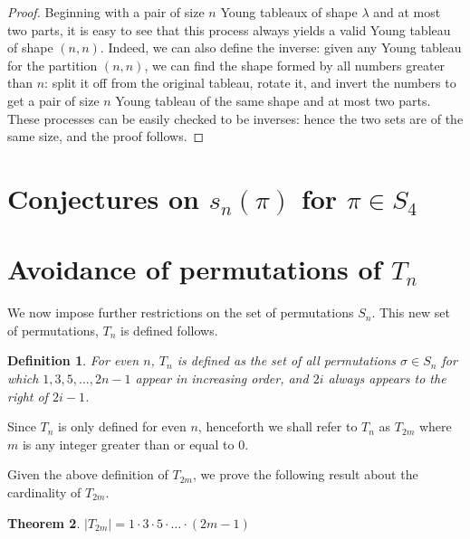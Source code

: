 \documentclass[11pt,letterpaper,twoside,english]{article}
\theoremstyle{theorem}
\newtheorem{theorem}{Theorem}
\newtheorem{definition}[theorem]{Definition}
\theoremstyle{remark}
\begin{document}
\begin{proof}
Beginning with a pair of size $n$ Young tableaux of shape $\lambda$ and at most two parts, it is easy to see that this process always yields a valid Young tableau of shape $(n, n)$. Indeed, we can also define the inverse: given any Young tableau for the partition $(n, n)$, we can find the shape formed by all numbers greater than $n$: split it off from the original tableau, rotate it, and invert the numbers to get a pair of size $n$ Young tableau of the same shape and at most two parts. These processes can be easily checked to be inverses: hence the two sets are of the same size, and the proof follows.
\end{proof}

\section{Conjectures on $s_n(\pi)$ for $\pi\in S_4$}
\label{S4}

\section{Avoidance of permutations of $T_n$}
\label{Tn}
We now impose further restrictions on the set of permutations $S_n$. This new set of permutations, $T_n$ is defined follows.

\begin{definition}
For even $n$, $T_n$ is defined as the set of all permutations $\sigma \in S_n$ for which $1,3,5,\ldots,2n-1$ appear in increasing order, and $2i$ always appears to the right of $2i-1$.
\end{definition}

Since $T_n$ is only defined for even $n$, henceforth we shall refer to $T_n$ as $T_{2m}$ where $m$ is any integer greater than or equal to $0$.

Given the above definition of $T_{2m}$, we prove the following result about the cardinality of $T_{2m}$.

\begin{theorem}
$|T_{2m}| = 1 \cdot 3 \cdot 5 \cdot \ldots \cdot (2m-1)$
\end{theorem}
\end{document}
